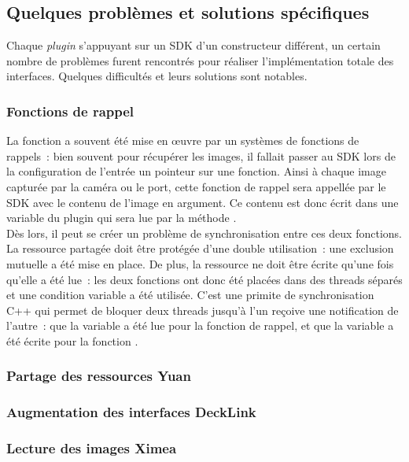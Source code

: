 \subsection{Quelques problèmes et solutions spécifiques}
Chaque \textit{plugin} s'appuyant sur un SDK d'un constructeur différent, un certain nombre
de problèmes furent rencontrés pour réaliser l'implémentation totale des interfaces.
Quelques difficultés et leurs solutions sont notables.

\subsubsection{Fonctions de rappel}
La fonction  a souvent été mise en \oe uvre par un systèmes
de fonctions de rappels~: bien souvent pour récupérer les images, il fallait passer au 
SDK lors de la configuration de l'entrée un pointeur sur une fonction\cite{fonction-de-rappel}.
Ainsi à chaque image capturée par la caméra ou le port, cette fonction de rappel sera appellée
par le SDK avec le contenu de l'image en argument. Ce contenu est donc écrit dans
une variable du plugin qui sera lue par la méthode .\\
Dès lors, il peut se créer un problème de synchronisation entre ces deux fonctions.
La ressource partagée doit être protégée d'une double utilisation~: une exclusion
mutuelle\cite{exclusion-mutuelle} a été mise en place. De plus, la ressource ne doit 
être écrite qu'une fois qu'elle a été lue~: les deux fonctions ont donc été placées 
dans des threads séparés et une condition variable a été utilisée. C'est une primite
de synchronisation C++ qui permet de bloquer deux threads jusqu'à l'un reçoive une
notification de l'autre\cite{condition-variable}~: que la variable a été lue pour
la fonction de rappel, et que la variable a été écrite pour la fonction .

\subsubsection{Partage des ressources Yuan}

\subsubsection{Augmentation des interfaces DeckLink}

\subsubsection{Lecture des images Ximea}


